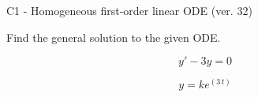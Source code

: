 \begin{exercise}
  \begin{exerciseTitle}C1 - Homogeneous first-order linear ODE (ver. 32)\end{exerciseTitle}
  \begin{exerciseStatement}
    
Find the general solution to the given ODE.

    
\[y'-3y=0\]

  \end{exerciseStatement}
  \begin{exerciseAnswer}
    
\[y= k e^{\left(3 \, t\right)}\]

  \end{exerciseAnswer}
\end{exercise}